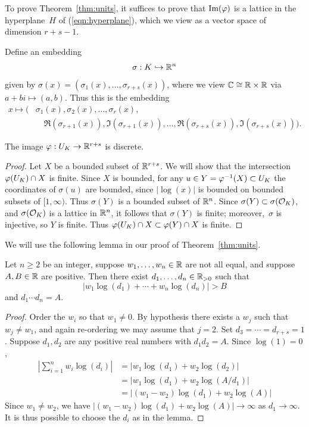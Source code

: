 To prove Theorem~\ref{thm:units}, it suffices to prove that
$\text{Im}(\varphi)$ is a lattice in the hyperplane~$H$ of
(\ref{eqn:hyperplane}), which we view as a vector space of dimension
$r+s-1$.

Define an embedding
\begin{equation}\label{eqn:sigma3}
 \sigma : K\hookrightarrow \mathbb{R}^n
\end{equation}
given by $\sigma(x) = (\sigma_1(x),\ldots,\sigma_{r+s}(x))$,
where we view $\mathbb{C}\cong \mathbb{R}\times \mathbb{R}$ via $a+b i\mapsto (a,b)$.
Thus this is the embedding
\begin{align*}
 x\mapsto \big(&\sigma_1(x), \sigma_2(x),\ldots, \sigma_r(x),\\
     &\quad \Re(\sigma_{r+1}(x)), \Im(\sigma_{r+1}(x)), 
    \ldots, \Re(\sigma_{r+s}(x)), \Im(\sigma_{r+s}(x))\big).
\end{align*}

\begin{lemma}\label{lem:ukdiscrete}
The image $\varphi:U_K\to \mathbb{R}^{r+s}$ is discrete.
\end{lemma}
\begin{proof}
Let $X$ be a bounded subset of $\mathbb{R}^{r+s}$.
We will show that the intersection $\varphi(U_K)\cap X$ is finite.
Since $X$ is bounded, for any $u\in
Y=\varphi^{-1}(X)\subset U_K$ the coordinates of $\sigma(u)$ are bounded, 
since $|\log(x)|$ is bounded on bounded subsets
of $[1,\infty)$.
Thus $\sigma(Y)$ is
a bounded subset of $\mathbb{R}^n$.  Since $\sigma(Y)\subset \sigma(\mathcal{O}_K)$,
and $\sigma(\mathcal{O}_K)$ is a lattice in $\mathbb{R}^n$, it follows that $\sigma(Y)$
is finite; moreover,~$\sigma$ is injective, so $Y$ is finite.
Thus $\varphi(U_K)\cap X \subset \varphi(Y) \cap X$ is finite.
\end{proof}

We will use the following lemma in our
proof of Theorem~\ref{thm:units}.
\begin{lemma}\label{lem:chooseci}
Let $n\geq 2$ be an integer, suppose $w_1,\ldots, w_n\in\mathbb{R}$
are not all equal, and suppose $A, B\in\mathbb{R}$ are positive. Then
there exist $d_1,\ldots, d_{n} \in \mathbb{R}_{>0}$ such that 
$$|w_1\log(d_1)+\cdots +w_{n}\log(d_{n})| > B$$  
and $d_1\cdots d_n = A$.
\end{lemma}
\begin{proof}
Order the $w_i$ so
that $w_1\neq 0$.  By hypothesis there exists a $w_j$ such that
$w_j\neq w_1$, and again re-ordering we may assume that $j=2$.  Set
$d_3=\cdots=d_{r+s}=1$.  Suppose $d_1, d_2$ are any positive real numbers
with  $d_1 d_2 = A$.  Since $\log(1)=0$,
\begin{align*}
  \left|\sum_{i=1}^{n} w_i \log(d_i)\right|
  &= |w_1\log(d_1) + w_2\log(d_2)|\\
  &= |w_1 \log(d_1) + w_2\log(A/d_1)| \\
  &= |(w_1-w_2)\log(d_1) + w_2\log(A)|
\end{align*}
Since $w_1\neq w_2$,  we have $|(w_1-w_2)\log(d_1) + w_2\log(A)|\to\infty$
as $d_1\to \infty$.  It is thus possible to choose the $d_i$ as in the lemma.
\end{proof}

